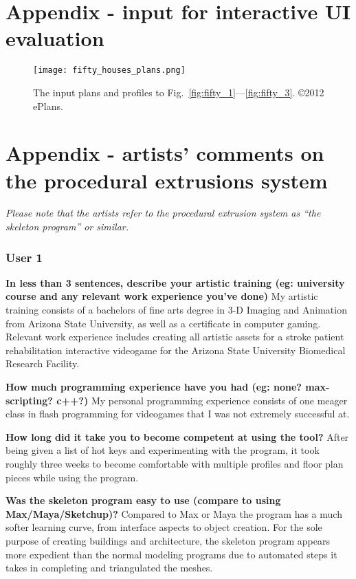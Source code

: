 
\chapter{Appendix - input for interactive UI evaluation}
\label{sec:50_plans}

\begin{figure}
  \centering
  \texttt{[image: fifty\_houses\_plans.png]}
  \caption[The source material for interactive evaluation]{\label{fig:fifty_houses_plans} The input plans and profiles to Fig.~\ref{fig:fifty_1}---\ref{fig:fifty_3}. \copyright 2012 ePlans.}
\end{figure}

\chapter{Appendix - artists' comments on the procedural extrusions system}
\label{sec:artists_comments}

\emph{Please note that the artists refer to the procedural extrusion system as ``the skeleton program'' or similar.}

\subsection{User 1}

{\bf In less than 3 sentences, describe your artistic training (eg: university course and any relevant work experience you've done)}
	My artistic training consists of a bachelors of fine arts degree in 3-D Imaging and Animation from Arizona State University, as well as a certificate in computer gaming. Relevant work experience includes creating all artistic assets for a stroke patient rehabilitation interactive videogame for the Arizona State University Biomedical Research Facility.

{\bf How much programming experience have you had (eg: none? max-scripting? c++?)}
My personal programming experience consists of one meager class in flash programming for videogames that I was not extremely successful at.

{\bf How long did it take you to become competent at using the tool?}
	After being given a list of hot keys and experimenting with the program, it took roughly three weeks to become comfortable with multiple profiles and floor plan pieces while using the program.

{\bf Was the skeleton program easy to use (compare to using Max/Maya/Sketchup)?}
	Compared to Max or Maya the program has a much softer learning curve, from interface aspects to object creation.  For the sole purpose of creating buildings and architecture, the skeleton program appears more expedient than the normal modeling programs due to automated steps it takes in completing and triangulated the meshes.

